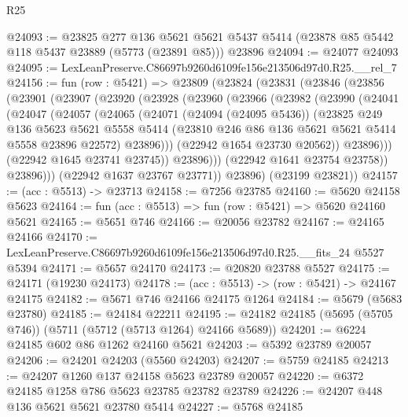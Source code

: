 \begin{lexlean}{R25}
\begin{coremodule}
@24093 := @23825
    @277
    @136
    @5621
    @5621
    @5437
    @5414
    (@23878 @85 @5442 @118 @5437 @23889 (@5773 (@23891 @85)))
    @23896
@24094 := @24077 @24093
@24095 := LexLeanPreserve.C86697b9260d6109fe156e213506d97d0.R25.__rel_7
@24156 := fun (row : @5421) =>
  @23809
    (@23824
      (@23831
        (@23846
          (@23856
            (@23901
              (@23907
                (@23920
                  (@23928
                    (@23960
                      (@23966
                        (@23982
                          (@23990
                            (@24041
                              (@24047
                                (@24057
                                  (@24065
                                    (@24071
                                      (@24094 (@24095 @5436))
                                      (@23825
                                        @249
                                        @136
                                        @5623
                                        @5621
                                        @5558
                                        @5414
                                        (@23810 @246 @86 @136 @5621 @5621 @5414 @5558 @23896 @22572)
                                        @23896)))
                                  (@22942 @1654 @23730 @20562))
                                @23896)))
                          (@22942 @1645 @23741 @23745))
                        @23896)))
                  (@22942 @1641 @23754 @23758))
                @23896)))
          (@22942 @1637 @23767 @23771))
        @23896)
      (@23199 @23821))
@24157 := (acc : @5513) -> @23713
@24158 := @7256 @23785
@24160 := @5620 @24158 @5623
@24164 := fun (acc : @5513) => fun (row : @5421) => @5620 @24160 @5621
@24165 := @5651 @746
@24166 := @20056 @23782
@24167 := @24165 @24166
@24170 := LexLeanPreserve.C86697b9260d6109fe156e213506d97d0.R25.__fits_24 @5527 @5394
@24171 := @5657 @24170
@24173 := @20820 @23788 @5527
@24175 := @24171 (@19230 @24173)
@24178 := (acc : @5513) -> (row : @5421) -> @24167 @24175
@24182 := @5671 @746 @24166 @24175 @1264
@24184 := @5679 (@5683 @23780)
@24185 := @24184 @22211
@24195 := @24182 @24185 (@5695 (@5705 @746)) (@5711 (@5712 (@5713 @1264) @24166 @5689))
@24201 := @6224 @24185 @602 @86 @1262 @24160 @5621
@24203 := @5392 @23789 @20057
@24206 := @24201 @24203 (@5560 @24203)
@24207 := @5759 @24185
@24213 := @24207 @1260 @137 @24158 @5623 @23789 @20057
@24220 := @6372 @24185 @1258 @786 @5623 @23785 @23782 @23789
@24226 := @24207 @448 @136 @5621 @5621 @23780 @5414
@24227 := @5768 @24185

\end{coremodule}
\end{lexlean}
